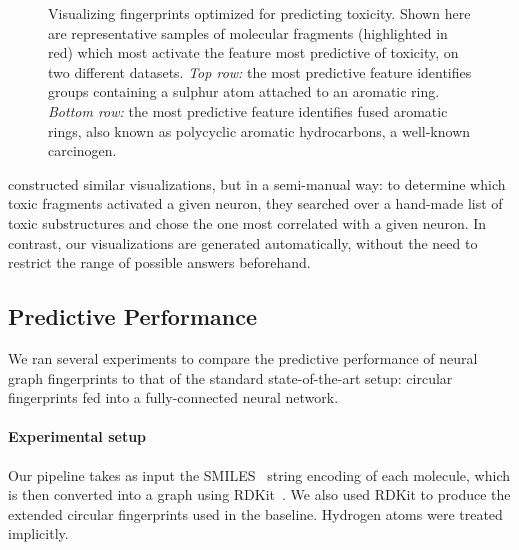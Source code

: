 \documentclass{article}
\newcommand{\citep}{\cite}
\newcommand{\citet}{\cite}
\begin{document}
\begin{figure}[h]
\begin{tabular}{>{\centering}m{1in} >{\centering}m{3.1cm} >{\centering}m{3.3cm} >{\centering\arraybackslash}m{3.1cm}}
\end{tabular}
\vspace{-3mm}
\caption{Visualizing fingerprints optimized for predicting toxicity.
Shown here are representative samples of molecular fragments (highlighted in red) which most activate the feature most predictive of toxicity, on two different datasets.
\emph{Top row:} the most predictive feature identifies groups containing a sulphur atom attached to an aromatic ring.
\emph{Bottom row:} the most predictive feature identifies fused aromatic rings, also known as polycyclic aromatic hydrocarbons, a well-known carcinogen.
}
\label{fig:learned features toxicity}
\end{figure}

\citet{unterthiner2015toxicity} constructed similar visualizations, but in a semi-manual way: to determine which toxic fragments activated a given neuron, they searched over a hand-made list of toxic substructures and chose the one most correlated with a given neuron.
In contrast, our visualizations are generated automatically, without the need to restrict the range of possible answers beforehand.

\subsection{Predictive Performance}

We ran several experiments to compare the predictive performance of neural graph fingerprints to that of the standard state-of-the-art setup: circular fingerprints fed into a fully-connected neural network.

\paragraph{Experimental setup}
Our pipeline takes as input the SMILES~\citep{weininger1988smiles} string encoding of each molecule, which is then converted into a graph using RDKit~\citep{rdkit}.
We also used RDKit to produce the extended circular fingerprints used in the baseline.
Hydrogen atoms were treated implicitly.
\end{document}
